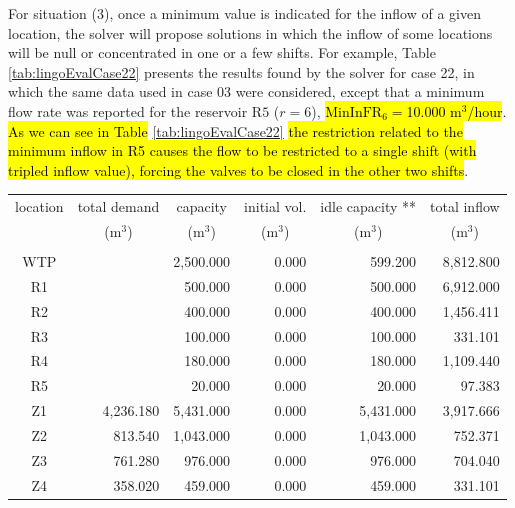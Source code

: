 \documentclass{singlecol}
\theoremstyle{TH}{
\newtheorem{lemma}{Lemma}
\newtheorem{theorem}[lemma]{Theorem}
\newtheorem{corrolary}[lemma]{Corrolary}
\newtheorem{conjecture}[lemma]{Conjecture}
\newtheorem{proposition}[lemma]{Proposition}
\newtheorem{claim}[lemma]{Claim}
\newtheorem{stheorem}[lemma]{Wrong Theorem}
\newtheorem{algorithm}{Algorithm}
}
\theoremstyle{THrm}{
\newtheorem{definition}{Definition}[section]
\newtheorem{question}{Question}[section]
\newtheorem{remark}{Remark}
\newtheorem{scheme}{Scheme}
}
\theoremstyle{THhit}{
\newtheorem{case}{Case}[section]
}
\begin{document}
For situation (3), once a minimum value is indicated for the inflow of a given location, the solver will propose solutions in which the inflow of some locations will be null or concentrated in one or a few shifts. For example, Table \ref{tab:lingoEvalCase22} presents the results found by the solver for case 22, in which the same data used in case 03 were considered, except that a minimum flow rate was reported for the reservoir $\mathrm{R5}$ ($r=6$), \hl{$\mathrm{MinInFR}_6 = $10.000 $\mathrm{m^3}$/hour}. \hl{As we can see in Table} \ref{tab:lingoEvalCase22} \hl{the restriction related to the minimum inflow in R5 causes the flow to be restricted to a single shift (with tripled inflow value), forcing the valves to be closed in the other two shifts}.

\begin{table}[h!]
\begin{center}
\begin{small}
	\begin{tabular}{ c r r r r r } 
		location & \multicolumn{1}{c}{total demand}      & \multicolumn{1}{c}{capacity} & \multicolumn{1}{c}{initial vol.} & \multicolumn{1}{c}{idle capacity **} & \multicolumn{1}{c}{total inflow}  \\
		      & \multicolumn{1}{c}{($\mathrm{m^3}$)} & \multicolumn{1}{c}{($\mathrm{m^3}$)}   & \multicolumn{1}{c}{($\mathrm{m^3}$)}     &  \multicolumn{1}{c}{($\mathrm{m^3}$)}   &  \multicolumn{1}{c}{($\mathrm{m^3}$)}               \\
		\\
		WTP   &           & 2,500.000 & 0.000 &  599.200 & 8,812.800 \\
		R1    &           &   500.000 & 0.000 &  500.000 & 6,912.000\\
		R2    &           &   400.000 & 0.000 &  400.000 & 1,456.411 \\
		R3    &           &   100.000 & 0.000 &  100.000 &   331.101 \\
	    R4    &           &   180.000 & 0.000 &  180.000 & 1,109.440  \\
	    R5    &           &    20.000 & 0.000 &   20.000 &    97.383 \\
	    Z1    & 4,236.180 & 5,431.000 & 0.000 &  5,431.000 & 3,917.666 \\
	    Z2    &   813.540 & 1,043.000 & 0.000 &  1,043.000 &   752.371 \\
	    Z3    &   761.280 &   976.000 & 0.000 &    976.000 &   704.040 \\
	    Z4    &   358.020 &   459.000 & 0.000 &    459.000 &   331.101 \\

\end{tabular}
\end{small}
\end{center}
\end{table}
\end{document}

